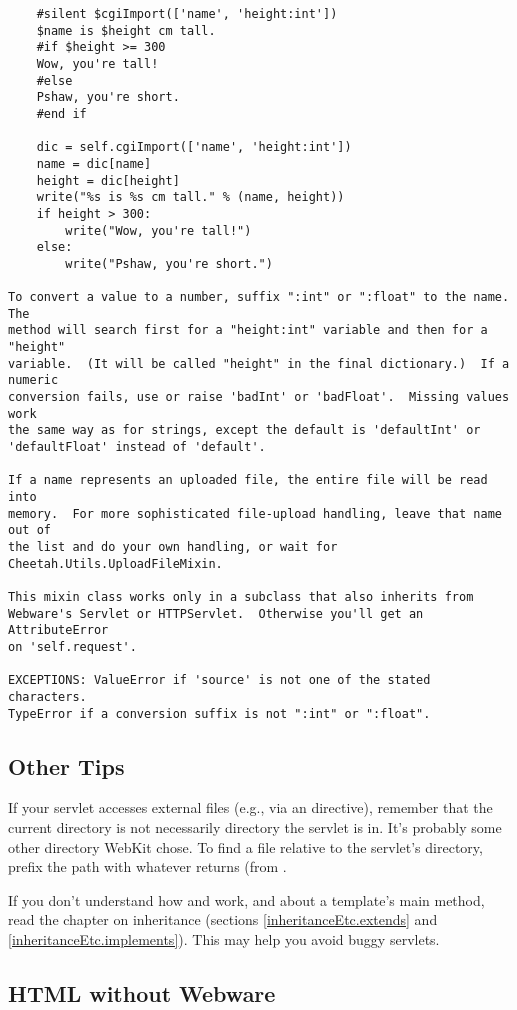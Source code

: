 \begin{verbatim}
    #silent $cgiImport(['name', 'height:int'])
    $name is $height cm tall.
    #if $height >= 300
    Wow, you're tall!
    #else
    Pshaw, you're short.
    #end if

    dic = self.cgiImport(['name', 'height:int'])
    name = dic[name]
    height = dic[height]
    write("%s is %s cm tall." % (name, height))
    if height > 300:
        write("Wow, you're tall!")
    else:
        write("Pshaw, you're short.")

To convert a value to a number, suffix ":int" or ":float" to the name.  The
method will search first for a "height:int" variable and then for a "height"
variable.  (It will be called "height" in the final dictionary.)  If a numeric
conversion fails, use or raise 'badInt' or 'badFloat'.  Missing values work
the same way as for strings, except the default is 'defaultInt' or
'defaultFloat' instead of 'default'.

If a name represents an uploaded file, the entire file will be read into 
memory.  For more sophisticated file-upload handling, leave that name out of
the list and do your own handling, or wait for Cheetah.Utils.UploadFileMixin.

This mixin class works only in a subclass that also inherits from 
Webware's Servlet or HTTPServlet.  Otherwise you'll get an AttributeError
on 'self.request'.

EXCEPTIONS: ValueError if 'source' is not one of the stated characters.
TypeError if a conversion suffix is not ":int" or ":float".
\end{verbatim}

\subsection{Other Tips}
\label{webware.otherTips}

If your servlet accesses external files (e.g., via an 
directive), remember that the current directory is not necessarily directory
the servlet is in.  It's probably some other directory WebKit chose.  To find a
file relative to the servlet's directory, prefix the path with whatever
 returns (from .

If you don't understand how  and  work, and
about a template's main method, read the chapter on inheritance (sections
\ref{inheritanceEtc.extends} and \ref{inheritanceEtc.implements}).  This may
help you avoid buggy servlets.

\subsection{HTML without Webware}
\label{webware.not}


